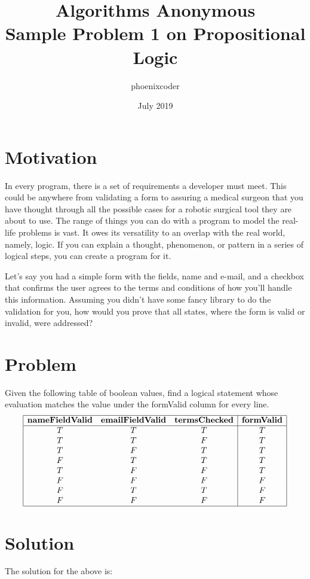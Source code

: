 \documentclass{article}
\title{Algorithms Anonymous\\
\large{Sample Problem 1 on Propositional Logic}}
\author{phoenixcoder}
\date{July 2019}
\begin{document}
\maketitle
\section{Motivation}
In every program, there is a set of requirements a developer must meet. This could
be anywhere from validating a form to assuring a medical surgeon that you have thought through all the possible cases for a robotic surgical tool they are about to use. The range of things you can do with a program to model the real-life problems is vast. It owes its versatility to an overlap with the real world, namely, logic. If you can explain a thought, phenomenon, or pattern in a series of logical steps, you can create a program for it.

Let's say you had a simple form with the fields, name and e-mail, and a checkbox that confirms the user agrees to the terms and conditions of how you'll handle this information. Assuming you didn't have some fancy library to do the validation for you, how would you prove that all states, where the form is valid or invalid, were addressed?

\section{Problem}
Given the following table of boolean values, find a logical statement whose evaluation matches the value under the formValid column for every line.
\begin{displaymath}
    \begin{array}{|c c c|c|}
    \hline
    \textbf{nameFieldValid} & \textbf{emailFieldValid} & \textbf{termsChecked} & \textbf{formValid}\\
    \hline
    T & T & T & T\\
    T & T & F & T\\
    T & F & T & T\\
    F & T & T & T\\
    T & F & F & T\\
    F & F & F & F\\
    F & T & T & F\\
    F & F & F & F\\
    \hline
    \end{array}
\end{displaymath}

\section{Solution}
The solution for the above is:
\end{document}
